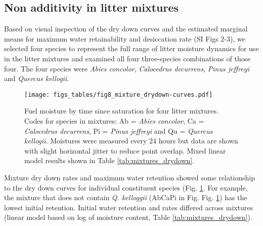 \documentclass[fire,article,submit,moreauthors,pdftex]{Definitions/mdpi}
\begin{document}
% 

\subsection{Non additivity in  litter mixtures}

Based on visual inspection of the dry down curves and the estimated marginal means for maximum water retainability and desiccation rate (SI Figs 2-3), we selected four species to represent the full range of litter moisture dynamics for use in the litter mixtures and examined all four three-species combinations of those four. The four species were \emph{Abies concolor}, \emph{Calocedrus decurrens}, \emph{Pinus jeffreyi} and \emph{Quercus kellogii}.

\begin{figure}[H]
  \centering
\texttt{[image: figs\_tables/fig8\_mixture\_drydown-curves.pdf]}
\caption{Fuel moisture by time since saturation for four litter mixtures.  Codes for species in mixtures: Ab = \emph{Abies concolor}, Ca = \emph{Calocedrus decurrens}, Pi = \emph{Pinus jeffreyi} and Qu = \emph{Quercus kellogii}. Moistures were measured every 24 hours but data are shown with slight horizontal jitter to reduce point overlap. Mixed linear model results shown in Table \ref{tab:mixtures_drydown}.}
  \label{fig:mixture_dry_down}
\end{figure}

Mixture dry down rates and maximum water retention showed some relationship to the dry down curves for individual constituent species (Fig. \ref{fig:mixture_dry_down}. For example, the mixture that does not contain \emph{Q. kelloggii} (AbCaPi in Fig. Fig. \ref{fig:mixture_dry_down}) has the lowest initial retention. Initial water retention and rates differed across mixtures (linear model based on log of moisture content, Table \ref{tab:mixtures_drydown}).
\end{document}
